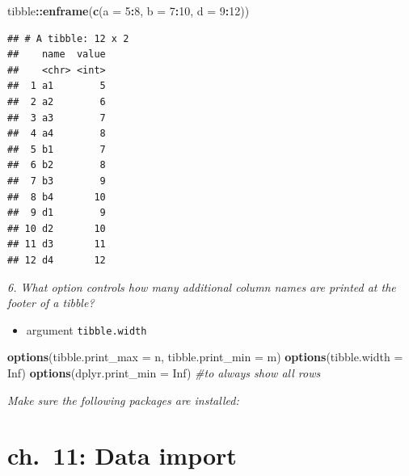 \documentclass[]{book}
\newenvironment{Shaded}{\begin{snugshade}}{\end{snugshade}}
\newcommand{\CommentTok}[1]{\textcolor[rgb]{0.56,0.35,0.01}{\textit{#1}}}
\newcommand{\DataTypeTok}[1]{\textcolor[rgb]{0.13,0.29,0.53}{#1}}
\newcommand{\DecValTok}[1]{\textcolor[rgb]{0.00,0.00,0.81}{#1}}
\newcommand{\KeywordTok}[1]{\textcolor[rgb]{0.13,0.29,0.53}{\textbf{#1}}}
\newcommand{\NormalTok}[1]{#1}
\newcommand{\OperatorTok}[1]{\textcolor[rgb]{0.81,0.36,0.00}{\textbf{#1}}}
\newcommand{\OtherTok}[1]{\textcolor[rgb]{0.56,0.35,0.01}{#1}}
\providecommand{\tightlist}{%
  \setlength{\itemsep}{0pt}\setlength{\parskip}{0pt}}
\theoremstyle{definition}
\theoremstyle{definition}
\theoremstyle{definition}
\theoremstyle{remark}
\begin{document}
\begin{Shaded}
\begin{Highlighting}[]
\NormalTok{tibble}\OperatorTok{::}\KeywordTok{enframe}\NormalTok{(}\KeywordTok{c}\NormalTok{(}\DataTypeTok{a =} \DecValTok{5}\OperatorTok{:}\DecValTok{8}\NormalTok{, }\DataTypeTok{b =} \DecValTok{7}\OperatorTok{:}\DecValTok{10}\NormalTok{, }\DataTypeTok{d =} \DecValTok{9}\OperatorTok{:}\DecValTok{12}\NormalTok{))}
\end{Highlighting}
\end{Shaded}

\begin{verbatim}
## # A tibble: 12 x 2
##    name  value
##    <chr> <int>
##  1 a1        5
##  2 a2        6
##  3 a3        7
##  4 a4        8
##  5 b1        7
##  6 b2        8
##  7 b3        9
##  8 b4       10
##  9 d1        9
## 10 d2       10
## 11 d3       11
## 12 d4       12
\end{verbatim}

\emph{6. What option controls how many additional column names are
printed at the footer of a tibble?}

\begin{itemize}
\tightlist
\item
  argument \texttt{tibble.width}
\end{itemize}

\begin{Shaded}
\begin{Highlighting}[]
\KeywordTok{options}\NormalTok{(}\DataTypeTok{tibble.print_max =}\NormalTok{ n, }\DataTypeTok{tibble.print_min =}\NormalTok{ m)}
\KeywordTok{options}\NormalTok{(}\DataTypeTok{tibble.width =} \OtherTok{Inf}\NormalTok{)}
\KeywordTok{options}\NormalTok{(}\DataTypeTok{dplyr.print_min =} \OtherTok{Inf}\NormalTok{) }\CommentTok{#to always show all rows}
\end{Highlighting}
\end{Shaded}

\emph{Make sure the following packages are installed:}

\hypertarget{ch.-11-data-import}{%
\chapter{ch.~11: Data import}\label{ch.-11-data-import}}
\end{document}
